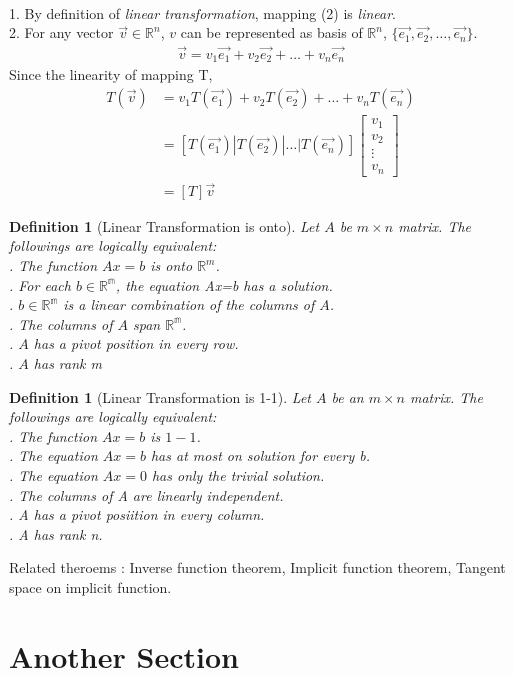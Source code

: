 \documentclass[a4paper,12pt]{article}
\makeatletter
\renewenvironment{proof}[1][\proofname] {\par\pushQED{\qed}\normalfont\topsep6\p@\@plus6\p@\relax\trivlist\item[\hskip\labelsep\bfseries#1\@addpunct{.}]\ignorespaces}{\popQED\endtrivlist\@endpefalse}
\theoremstyle{break}
\newtheorem{definition}[theorem]{Definition}
\makeatother
\begin{document}
\begin{proof}[Proof of theorem \ref{thm:mlt}] \hfill \\
1. By definition of \textit{linear transformation}, mapping (2) is \textit{linear}.\\
2. For any vector $\overrightarrow{v}\in \mathbb{R}^n$, $v$ can be represented as basis of $\mathbb{R}^n$, $\{\overrightarrow{e_1},\overrightarrow{e_2}, \dots, \overrightarrow{e_n}\}$.
\begin{align}
    \overrightarrow{v} = v_1\overrightarrow{e_1}+v_2\overrightarrow{e_2}+\dots+v_n\overrightarrow{e_n}
\end{align}
Since the linearity of mapping T,
\begin{align*}
    T(\overrightarrow{v})&=v_1T(\overrightarrow{e_1})+v_2T(\overrightarrow{e_2})+\dots+v_nT(\overrightarrow{e_n})\\
    &=[T(\overrightarrow{e_1})|T(\overrightarrow{e_2})|\dots|T(\overrightarrow{e_n})]\begin{bmatrix}v_1 \\ v_2 \\ \vdots \\ v_n\end{bmatrix}\\
    &= [T]\overrightarrow{v}
\end{align*}
\end{proof}

\begin{definition} [Linear Transformation is onto]
    Let $A$ be $m\times n$ matrix. The followings are logically equivalent: \\
    . The function $Ax=b$ is onto $\mathbb{R}^m$.\\
    . For each $b\in \mathbb{R^m}$, the equation Ax=b has a solution.\\
    . $b\in \mathbb{R^m}$ is a linear combination of the columns of $A$.\\
    . The columns of $A$ span $\mathbb{R^m}$.\\
    . $A$ has a pivot position in every row.\\
    . $A$ has rank m\\
\end{definition}

\begin{definition} [Linear Transformation is 1-1]
    Let $A$ be an $m\times n$ matrix. The followings are logically equivalent:\\
    . The function $Ax=b$ is $1-1$.\\
    . The equation $Ax=b$ has at most on solution for every b.\\
    . The equation $Ax=0$ has only the trivial solution.\\
    . The columns of A are linearly independent.\\
    . A has a pivot posiition in every column.\\
    . A has rank n.\\
\end{definition}

Related theroems : Inverse function theorem, Implicit function theorem, Tangent space on implicit function.

\section{Another Section}
\end{document}
